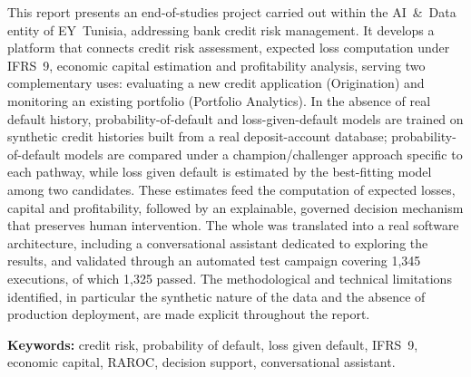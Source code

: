 \noindent This report presents an end-of-studies project carried out within the AI~\&~Data entity of EY~Tunisia, addressing bank credit risk management. It develops a platform that connects credit risk assessment, expected loss computation under IFRS~9, economic capital estimation and profitability analysis, serving two complementary uses: evaluating a new credit application (Origination) and monitoring an existing portfolio (Portfolio Analytics). In the absence of real default history, probability-of-default and loss-given-default models are trained on synthetic credit histories built from a real deposit-account database; probability-of-default models are compared under a champion/challenger approach specific to each pathway, while loss given default is estimated by the best-fitting model among two candidates. These estimates feed the computation of expected losses, capital and profitability, followed by an explainable, governed decision mechanism that preserves human intervention. The whole was translated into a real software architecture, including a conversational assistant dedicated to exploring the results, and validated through an automated test campaign covering 1,345 executions, of which 1,325 passed. The methodological and technical limitations identified, in particular the synthetic nature of the data and the absence of production deployment, are made explicit throughout the report.

\medskip
\noindent\textbf{Keywords:} credit risk, probability of default, loss given default, IFRS~9, economic capital, RAROC, decision support, conversational assistant.
